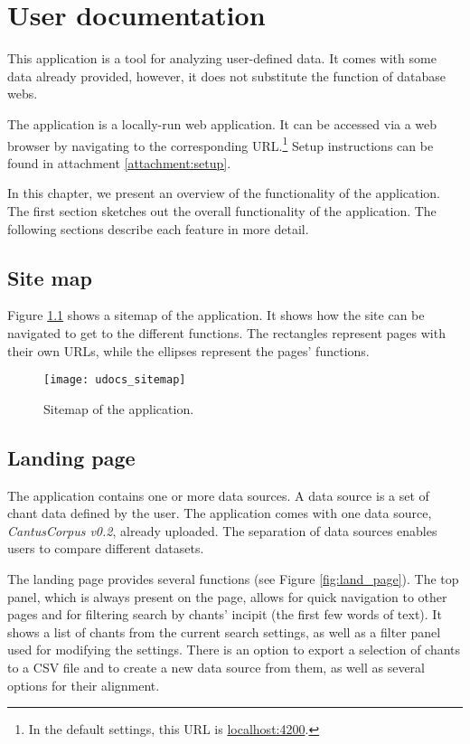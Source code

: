 \chapter{User documentation}

This application is a tool for analyzing user-defined data. It comes with some data already provided, however, it does not substitute the
function of database webs.

The application is a locally-run web application. It can be accessed via a web browser by navigating to the corresponding URL.\footnote{
In the default settings, this URL is \url{localhost:4200}.} Setup instructions can be found in attachment \ref{attachment:setup}.

In this chapter, we present an overview of the functionality of the application. The first section sketches out the overall
functionality of the application. The following sections describe each feature in more detail.


\section{Site map}

Figure \ref{fig:sitemap} shows a sitemap of the application. It shows how the site can be navigated to get to the different functions.
The rectangles represent pages with their own URLs, while the ellipses represent the pages' functions.

\begin{figure}[!h]
\centering
\texttt{[image: udocs\_sitemap]}
\caption{Sitemap of the application.}
\label{fig:sitemap}
\end{figure}

\section{Landing page}

The application contains one or more data sources. A data source is a set of chant data defined by the user. The application comes with one data
source, \emph{CantusCorpus v0.2}, already uploaded. The separation of data sources enables users to compare different datasets.

The landing page provides several functions (see Figure \ref{fig:land_page}). The top panel, which is always present on the page, allows for quick
navigation to other pages and for filtering search by chants' incipit (the first few words of text). It shows a list of chants from the current search
settings, as well as a filter panel used for modifying the settings. There is an option to export a selection of chants to a CSV file and to create a new
data source from them, as well as several options for their alignment.

